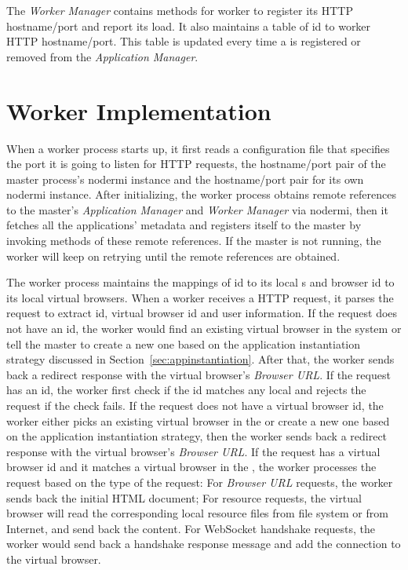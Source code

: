 The \emph{Worker Manager} contains methods for worker to register its HTTP
hostname/port and report its load. It also maintains a table of \appins{} id
to worker HTTP hostname/port. This table is updated every time a \appins{}
is registered or removed from the \emph{Application Manager}.




\section{Worker Implementation}
\label{sec:worker}

When a worker process starts up, it first reads a configuration file that
specifies the port it is going to listen for HTTP requests,  the hostname/port
pair of the master process's nodermi instance   and the hostname/port pair for
its own nodermi instance. After initializing, the worker process obtains
remote references to the master's \emph{Application Manager} and \emph{Worker
Manager} via nodermi, then  it fetches all the applications' metadata and
registers itself to the master by invoking methods of these remote references.
If the master is not running, the worker will keep on retrying until the
remote references are obtained.

The worker process maintains the mappings of \appins{} id to its local
\appins{}s and browser id to its local virtual browsers.
When a worker receives a HTTP request, it parses the request to extract
\appins id, virtual browser id and user information. If the request does not
have an \appins id, the worker would find an existing virtual browser in the
system or tell the master to create a new one  based on the application
instantiation strategy discussed in Section~\ref{sec:appinstantiation}. After
that, the worker sends back a redirect response with the virtual browser's
\emph{Browser URL}. If the request has an \appins id, the worker first check
if the id matches any local \appins and rejects the request if the check
fails. If the request does not have a virtual browser id, the worker either
picks an existing virtual browser in the \appins  or create a new one based on
the application instantiation strategy, then the worker sends back a redirect
response with  the virtual browser's \emph{Browser URL}. If the request has a
virtual browser id and it matches a virtual browser in the \appins, the worker
processes the request based on the type of the request: For \emph{Browser URL}
requests, the worker sends back the initial  HTML document; For resource
requests, the virtual browser will read the corresponding local resource files
from file system or from Internet, and send back the content. For WebSocket
handshake requests, the worker would send back a handshake response message
and add the connection to the virtual browser.


